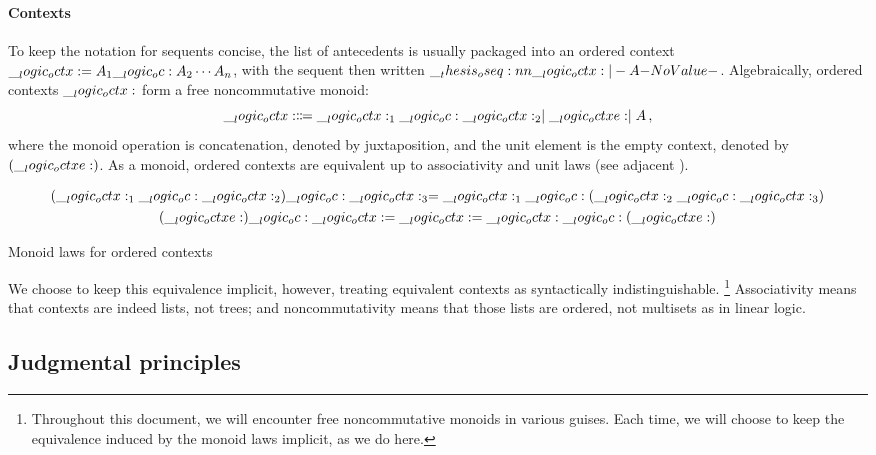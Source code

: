 \paragraph{Contexts}
To keep the notation for sequents concise, the list of antecedents is usually packaged into an ordered context $\__logic_octx: = A_1 \__logic_oc: A_2 \dotsb A_n$, with the sequent then written $\oseq{\octx |- A}$.
Algebraically, ordered contexts $\__logic_octx:$ form a free noncommutative monoid:
\begin{equation*}
  \__logic_octx: \Coloneqq \__logic_octx:_1 \__logic_oc: \__logic_octx:_2 \mid \__logic_octxe: \mid A \,,
\end{equation*}
where the monoid operation is concatenation, denoted by juxtaposition, and the unit element is the empty context, denoted by $(\__logic_octxe:)$.
As a monoid, ordered contexts are equivalent up to associativity and unit laws (see adjacent ).%
\begin{marginfigure}
  \begin{gather*}
    (\__logic_octx:_1 \__logic_oc: \__logic_octx:_2) \__logic_oc: \__logic_octx:_3 = \__logic_octx:_1 \__logic_oc: (\__logic_octx:_2 \__logic_oc: \__logic_octx:_3) \\
    (\__logic_octxe:) \__logic_oc: \__logic_octx: = \__logic_octx: = \__logic_octx: \__logic_oc: (\__logic_octxe:)
  \end{gather*}
  \caption{Monoid laws for ordered contexts}\label{fig:ordered-logic:monoid-laws}
\end{marginfigure}
We choose to keep this equivalence implicit, however, treating equivalent contexts as syntactically indistinguishable.%
\footnote{Throughout this document, we will encounter free noncommutative monoids in various guises.
Each time, we will choose to keep the equivalence induced by the monoid laws implicit, as we do here.}
%
Associativity means that contexts are indeed lists, not trees; and noncommutativity means that those lists are ordered, not multisets as in linear logic.





\subsection{Judgmental principles}

